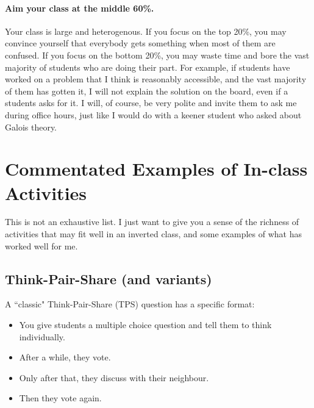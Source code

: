 \documentclass[11pt]{article}
\begin{document}
	\paragraph{Aim your class at the middle 60\%.}
	Your class is large and heterogenous. If you focus on the top 20\%, you may convince
	yourself that everybody gets something when most of them are confused. If you
	focus on the bottom 20\%, you may waste time and bore the vast majority of
	students who are doing their part. For example, if students have worked on a
	problem that I think is reasonably accessible, and the vast majority of them has
	gotten it, I will not explain the solution on the board, even if a students asks
	for it. I will, of course, be very polite and invite them to ask me during
	office hours, just like I would do with a keener student who asked about Galois
	theory.

	\newpage

	\section[3. Commentated Examples of In-class Activities]{Commentated Examples
	of In-class Activities}
	\label{sec:activities}

	This is not an exhaustive list. I just want to give you a sense of the
	richness of activities that may fit well in an inverted class, and some examples
	of what has worked well for me.

	\subsection{Think-Pair-Share (and variants)}

	A ``classic" Think-Pair-Share (TPS) question has a specific format:
	\begin{itemize}
		\item You give students a multiple choice question and tell them to think individually.

		\item After a while, they vote.

		\item Only after that, they discuss with their neighbour.

		\item Then they vote again.
	\end{itemize}
\end{document}
